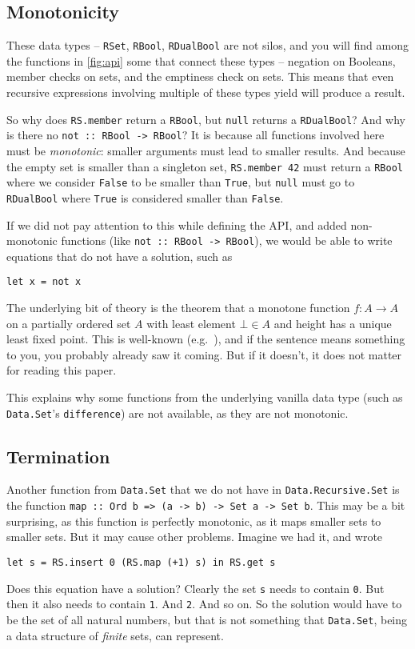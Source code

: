 \documentclass[manuscript,screen,acmsmall]{acmart}
\begin{document}
\subsection{Monotonicity}\label{sec:monotonicity}

These data types -- \verb|RSet|, \verb|RBool|, \verb|RDualBool| are not silos, and you will find among the functions in \cref{fig:api} some that connect these types -- negation on Booleans, member checks on sets, and the emptiness check on sets.
This means that even recursive expressions involving multiple of these types yield will produce a result.

So why does \verb|RS.member| return a \verb|RBool|, but \verb|null| returns a \verb|RDualBool|? And why is there no \verb|not :: RBool -> RBool|? It is because all functions involved here must be \emph{monotonic}: smaller arguments must lead to smaller results. And because the empty set is smaller than a singleton set, \verb|RS.member 42| must return a \verb|RBool| where we consider \verb|False| to be smaller than \verb|True|, but \verb|null| must go to \verb|RDualBool| where \verb|True| is considered smaller than \verb|False|.

If we did not pay attention to this while defining the API, and added non-monotonic functions (like \verb|not :: RBool -> RBool|), we would be able to write equations that do not have a solution, such as
\begin{verbatim}
let x = not x
\end{verbatim}

The underlying bit of theory is the theorem that a monotone function $f : A \to A$ on a partially ordered set $A$ with least element $\bot \in A$ and height has a unique least fixed point. This is well-known (e.g.\ \citet{lazyleast}), and if the sentence means something to you, you probably already saw it coming. But if it doesn't, it does not matter for reading this paper.

This explains why some functions from the underlying vanilla data type (such as \verb|Data.Set|'s \verb|difference|) are not available, as they are not monotonic.

\subsection{Termination}

Another function from \verb|Data.Set| that we do not have in \verb|Data.Recursive.Set| is the function \verb|map :: Ord b => (a -> b) -> Set a -> Set b|. This may be a bit surprising, as this function is perfectly monotonic, as it maps smaller sets to smaller sets. But it may cause other problems. Imagine we had it, and wrote
\begin{verbatim}
let s = RS.insert 0 (RS.map (+1) s) in RS.get s
\end{verbatim}
Does this equation have a solution? Clearly the set \verb|s| needs to contain \verb|0|. But then it also needs to contain \verb|1|. And \verb|2|. And so on. So the solution would have to be the set of all natural numbers, but that is not something that \verb|Data.Set|, being a data structure of \emph{finite} sets, can represent.
\end{document}
